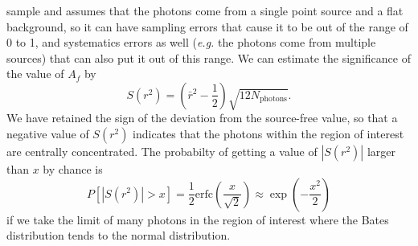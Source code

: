 \documentclass[useAMS,usenatbib]{mn2e}
\begin{document}
sample and assumes that the photons come from a single point source
and a flat background, so it can have sampling errors that cause it to
be out of the range of 0 to 1, and systematics errors as well
({\em e.g.} the photons come from multiple sources) that can also put it out
of this range. We can estimate the significance of the value of $A_f$ by
\begin{equation}
  S(r^2) = \left ( \bar r^2-\frac{1}{2} \right ) \sqrt{12 N_\mathrm{photons}}.
\label{eq:11}
\end{equation}
We have retained the sign of the deviation from the source-free value,
so that a negative value of $S(r^2)$ indicates that the photons within
the region of interest are centrally concentrated.  The probabilty of
getting a value of $|S(r^2)|$ larger than $x$ by chance is
\begin{equation}
  P\left [ |S(r^2)| > x \right ] = \frac{1}{2} \mathrm{erfc} \left ( \frac{x}{\sqrt{2}} \right
  ) \approx \exp \left (-\frac{x^2}{2} \right )
  \label{eq:12}
\end{equation}
if we take the limit of many photons in the region of interest where
the Bates distribution tends to the normal distribution.  
\end{document}
